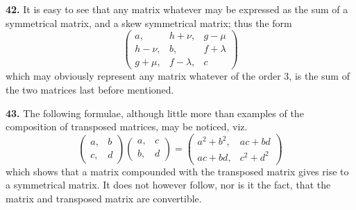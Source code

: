 \documentclass[11pt,a4paper]{book}
\begin{document}
\begin{center}
\medskip
\noindent\textbf{42.} It is easy to see that any matrix whatever may be expressed as the sum of a symmetrical matrix, and a skew symmetrical matrix; thus the form
\[
\begin{pmatrix} a, & h+\nu, & g-\mu \\ h-\nu, & b, & f+\lambda \\ g+\mu, & f-\lambda, & c \end{pmatrix}
\]
which may obviously represent any matrix whatever of the order 3, is the sum of the two matrices last before mentioned.

\medskip
\noindent\textbf{43.} The following formulae, although little more than examples of the composition of transposed matrices, may be noticed, viz.
\[
\begin{pmatrix} a, & b \\ c, & d \end{pmatrix}
\begin{pmatrix} a, & c \\ b, & d \end{pmatrix}
=
\begin{pmatrix} a^2+b^2, & ac+bd \\ ac+bd, & c^2+d^2 \end{pmatrix}
\]
which shows that a matrix compounded with the transposed matrix gives rise to a symmetrical matrix. It does not however follow, nor is it the fact, that the matrix and transposed matrix are convertible.


\end{center}
\end{document}
